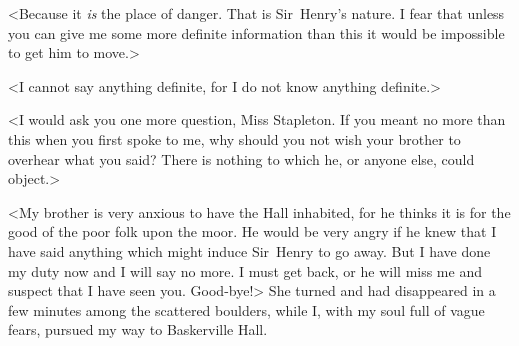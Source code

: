 <Because it \textit{is} the place of danger. That is Sir~Henry's nature. I fear that unless you can give me some more definite information than this it would be impossible to get him to move.>

<I cannot say anything definite, for I do not know anything definite.>

<I would ask you one more question, Miss Stapleton. If you meant no more than this when you first spoke to me, why should you not wish your brother to overhear what you said? There is nothing to which he, or anyone else, could object.>

<My brother is very anxious to have the Hall inhabited, for he thinks it is for the good of the poor folk upon the moor. He would be very angry if he knew that I have said anything which might induce Sir~Henry to go away. But I have done my duty now and I will say no more. I must get back, or he will miss me and suspect that I have seen you. Good-bye!> She turned and had disappeared in a few minutes among the scattered boulders, while I, with my soul full of vague fears, pursued my way to Baskerville Hall.
